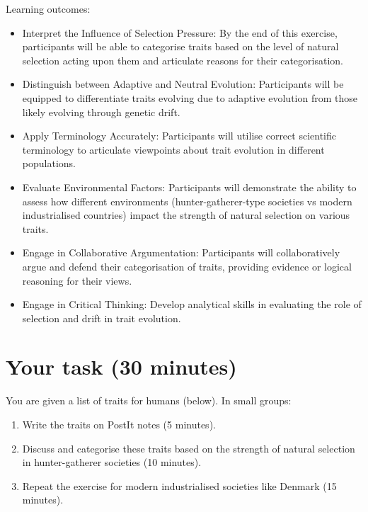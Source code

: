 \documentclass[
  a4paper]{book}
\providecommand{\tightlist}{%
  \setlength{\itemsep}{0pt}\setlength{\parskip}{0pt}}
\begin{document}
\begin{do-something}
Learning outcomes:

\begin{itemize}
\tightlist
\item
  Interpret the Influence of Selection Pressure: By the end of this
  exercise, participants will be able to categorise traits based on the
  level of natural selection acting upon them and articulate reasons for
  their categorisation.
\item
  Distinguish between Adaptive and Neutral Evolution: Participants will
  be equipped to differentiate traits evolving due to adaptive evolution
  from those likely evolving through genetic drift.
\item
  Apply Terminology Accurately: Participants will utilise correct
  scientific terminology to articulate viewpoints about trait evolution
  in different populations.
\item
  Evaluate Environmental Factors: Participants will demonstrate the
  ability to assess how different environments (hunter-gatherer-type
  societies vs modern industrialised countries) impact the strength of
  natural selection on various traits.
\item
  Engage in Collaborative Argumentation: Participants will
  collaboratively argue and defend their categorisation of traits,
  providing evidence or logical reasoning for their views.
\item
  Engage in Critical Thinking: Develop analytical skills in evaluating
  the role of selection and drift in trait evolution.
\end{itemize}
\end{do-something}

\hypertarget{your-task-30-minutes}{%
\section{Your task (30 minutes)}\label{your-task-30-minutes}}

You are given a list of traits for humans (below). In small groups:

\begin{enumerate}
\def\labelenumi{\arabic{enumi}.}
\tightlist
\item
  Write the traits on PostIt notes (5 minutes).
\item
  Discuss and categorise these traits based on the strength of natural selection in hunter-gatherer societies (10 minutes).
\item
  Repeat the exercise for modern industrialised societies like Denmark (15 minutes).
\end{enumerate}
\end{document}
